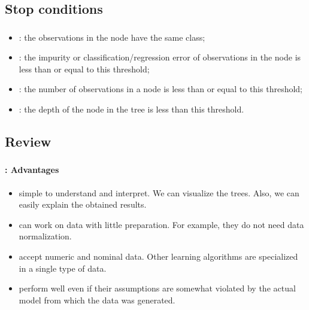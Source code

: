 \documentclass[xcolor=table]{beamer}
\begin{document}
\subsection{Stop conditions}

\begin{frame}
	\frametitle{\insertsection}
	\framesubtitle{\insertsubsection}
	
	\begin{itemize}
		\item {}: the observations in the node have the same class;
		\item {}: the impurity or classification/regression error of observations in the node is less than or equal to this threshold;
		\item {}: the number of observations in a node is less than or equal to this threshold;
		\item {}: the depth of the node in the tree is less than this threshold.
	\end{itemize}
	
\end{frame}

\subsection{Review}

\begin{frame}
	\frametitle{\insertsection}
	\framesubtitle{\insertsubsection: Advantages}
	
	\begin{itemize}
		\item simple to understand and interpret. We can visualize the trees. Also, we can easily explain the obtained results.
		\item can work on data with little preparation. For example, they do not need data normalization.
		\item accept numeric and nominal data. Other learning algorithms are specialized in a single type of data.
		\item perform well even if their assumptions are somewhat violated by the actual model from which the data was generated.
	\end{itemize}
	
\end{frame}
\end{document}
